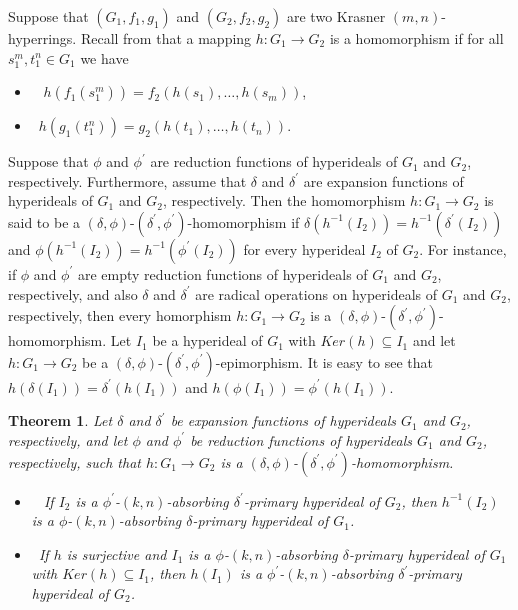 \documentclass[preprint,review,10pt]{amsart}
\newtheorem{theorem}{Theorem}[section]
\theoremstyle{definition}
\theoremstyle{remark}
\numberwithin{equation}{section}
\begin{document}
Suppose that $(G_1, f_1, g_1)$ and $(G_2, f_2, g_2)$ are two Krasner $(m, n)$-hyperrings. Recall from \cite{d1} that a mapping
$h : G_1 \longrightarrow G_2$ is  a homomorphism if for all $s^m _1, t^n_ 1 \in G_1$ we have
\begin{itemize} 
\item[\rm(i)]~ $ h(f_1(s_1^m)) = f_2(h(s_1),\ldots,h(s_m))$, 
\item[\rm(ii)]~$ h(g_1(t_1^n)) = g_2(h(t_1),\ldots,h(t_n)). $
\end{itemize} 
Suppose that $\phi$ and $\phi^{\prime}$ are reduction functions of hyperideals of $G_1$ and $G_2$, respectively. Furthermore, assume that $\delta$ and $\delta^{\prime}$ are  expansion  functions of hyperideals of $G_1$ and $G_2$, respectively.  Then the homomorphism  $h : G_1 \longrightarrow G_2$ is said to be a $(\delta,\phi)$-$(\delta^{\prime},\phi^{\prime})$-homomorphism if $\delta(h^{-1}(I_2))=h^{-1}(\delta^{\prime}(I_2))$ and $\phi(h^{-1}(I_2))=h^{-1}(\phi^{\prime}(I_2))$ for every hyperideal $I_2$ of $G_2$. For instance, if $\phi$ and $\phi^{\prime}$ are  empty reduction functions of hyperideals of $G_1$ and $G_2$, respectively, and also $\delta$ and $\delta^{\prime}$ are radical operations on hyperideals of $G_1$ and $G_2$, respectively, then every homorphism $h : G_1 \longrightarrow G_2$ is a $(\delta,\phi)$-$(\delta^{\prime},\phi^{\prime})$-homomorphism.
Let   $I_1$ be a hyperideal of $G_1$ with $Ker (h) \subseteq I_1$ and let $h : G_1 \longrightarrow G_2$ be a $(\delta,\phi)$-$(\delta^{\prime},\phi^{\prime})$-epimorphism. It is easy to see that $h(\delta(I_1))=\delta^{\prime}(h(I_1))$ and  $h(\phi(I_1))=\phi^{\prime}(h(I_1))$.
\begin{theorem} \label{homo}
Let $\delta$ and $\delta^{\prime}$ be expansion functions of hyperideals $G_1$ and $G_2$, respectively, and let
$\phi$ and $\phi^{\prime}$ be reduction functions of hyperideals $G_1$ and $G_2$, respectively, such that $h:G_1 \longrightarrow G_2$  is  a $(\delta,\phi)$-$(\delta^{\prime},\phi^{\prime})$-homomorphism.
\begin{itemize} 
\item[\rm(1)]~ If $I_2$ is a $\phi^{\prime}$-$(k,n)$-absorbing $\delta^{\prime}$-primary hyperideal of $G_2$, then $h^{-1}(I_2)$ is a $\phi$-$(k,n)$-absorbing $\delta$-primary hyperideal of $G_1$. 
\item[\rm(2)]~If $h$ is surjective and $I_1$ is a $\phi$-$(k,n)$-absorbing $\delta$-primary hyperideal of $G_1$ with $Ker (h) \subseteq I_1$, then $h(I_1)$ is a $\phi^{\prime}$-$(k,n)$-absorbing $\delta^{\prime}$-primary hyperideal of $G_2$.
\end{itemize} 
\end{theorem}
\end{document}
